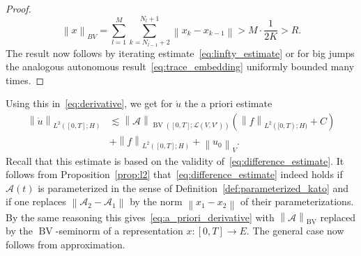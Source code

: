 \documentclass[reqno,a4paper,final]{amsart}
\numberwithin{equation}{section}
\theoremstyle{definition}
\begin{document}
\begin{proof}
		\begin{equation*}
			{\left\lVert{x}\right\rVert}_{BV} = \sum_{l=1}^M \sum_{k=N_{l-1}+2}^{N_l + 1} {\left\lVert{x_k - x_{k-1}}\right\rVert} > M \cdot \frac{1}{2K} > R.
		\end{equation*}
		The result now follows by iterating estimate~\eqref{eq:linfty_estimate} or for big jumps the analogous autonomous result~\eqref{eq:trace_embedding} uniformly bounded many times.
	\end{proof}
	
	Using this in~\eqref{eq:derivative}, we get for $\dot{u}$ the a priori estimate
	\begin{equation}
		\label{eq:a_priori_derivative}
		\begin{split}
			{\left\lVert{\dot{u}}\right\rVert}_{L^2([0,T];H)} & \lesssim {\left\lVert{\mathcal{A}}\right\rVert}_{\operatorname{BV}([0,T];\mathcal{L}(V,V'))} ({\left\lVert{f}\right\rVert}_{L^2([0,T);H)} + C) \\
			& + {\left\lVert{f}\right\rVert}_{L^2([0,T];H)} + {\left\lVert{u_0}\right\rVert}_V.
		\end{split}
	\end{equation}
	Recall that this estimate is based on the validity of~\eqref{eq:difference_estimate}. It follows from Proposition~\ref{prop:l2} that~\eqref{eq:difference_estimate} indeed holds if $\mathcal{A}(t)$ is parameterized in the sense of Definition~\ref{def:parameterized_kato} and if one replaces ${\left\lVert{\mathcal{A}_2 - \mathcal{A}_1}\right\rVert}$ by the norm ${\left\lVert{x_1 - x_2}\right\rVert}$ of their parameterizations. By the same reasoning this gives~\eqref{eq:a_priori_derivative} with ${\left\lVert{\mathcal{A}}\right\rVert}_\operatorname{BV}$ replaced by the $\operatorname{BV}$-seminorm of a representation $x\colon [0,T] \to E$. The general case now follows from approximation.
	
\end{document}
